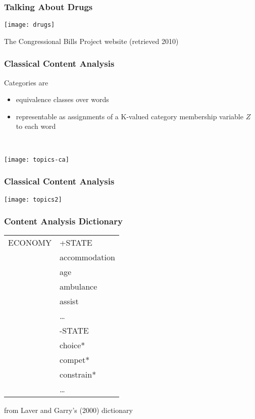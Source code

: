 \documentclass[11pt,compress,professionalfonts]{beamer}
\newcommand{\ita}{\begin{itemize}}
\newcommand{\itm}{\item[]}
\newcommand{\itz}{\end{itemize}}
\begin{document}
\begin{frame}[t,fragile]\frametitle{Talking About Drugs}

\centerline{\texttt{[image: drugs]}}

The Congressional Bills Project website (retrieved 2010)
%
%
%

%
%
%
%
%
%


\end{frame}
\begin{frame}[t,fragile]\frametitle{Classical Content Analysis}

Categories are
\ita
\itm equivalence classes over words
\itm representable as assignments of a K-valued category membership variable $Z$ to each word
\itz

~\\
\centerline{\texttt{[image: topics-ca]}}


\end{frame}
\begin{frame}[t,fragile]\frametitle{Classical Content Analysis}

\centerline{\texttt{[image: topics2]}}

\end{frame}
\begin{frame}[t,fragile]\frametitle{Content Analysis Dictionary}

\small

\begin{tabular}{ll}
ECONOMY & +STATE\\
& accommodation\\
& age\\
& ambulance\\
& assist\\
& \ldots\\
& -STATE\\
& choice*\\
& compet*\\
& constrain*\\
& \ldots
\end{tabular}
\normalsize

from Laver and Garry's (2000) dictionary

\end{frame}
\end{document}

